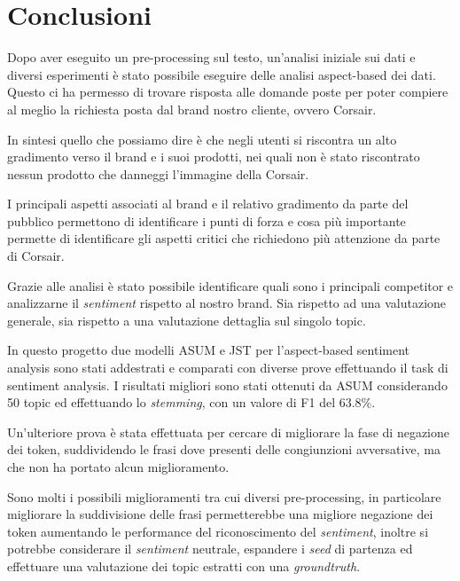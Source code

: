 \section{Conclusioni}
Dopo aver eseguito un pre-processing sul testo, un'analisi iniziale sui dati e diversi esperimenti è stato possibile eseguire delle analisi aspect-based dei dati. Questo ci ha permesso di trovare risposta alle domande poste per poter compiere al meglio la richiesta posta dal brand nostro cliente, ovvero Corsair.

In sintesi quello che possiamo dire è che negli utenti si riscontra un alto gradimento verso il brand e i suoi prodotti, nei quali non è stato riscontrato nessun prodotto che danneggi l'immagine della Corsair.

I principali aspetti associati al brand e il relativo gradimento da parte del pubblico permettono di identificare i punti di forza e cosa più importante permette di identificare gli aspetti critici che richiedono più attenzione da parte di Corsair.

Grazie alle analisi è stato possibile identificare quali sono i principali competitor e analizzarne il \textit{sentiment} rispetto al nostro brand. Sia rispetto ad una valutazione generale, sia rispetto a una valutazione dettaglia sul singolo topic.

In questo progetto due modelli ASUM e JST per l'aspect-based sentiment analysis sono stati addestrati e comparati con diverse prove effettuando il task di sentiment analysis. I risultati migliori sono stati ottenuti da ASUM considerando 50 topic ed effettuando lo \textit{stemming}, con un valore di F1 del 63.8\%.

Un'ulteriore prova è stata effettuata per cercare di migliorare la fase di negazione dei token, suddividendo le frasi dove presenti delle congiunzioni avversative, ma che non ha portato alcun miglioramento.

Sono molti i possibili miglioramenti tra cui diversi pre-processing, in particolare migliorare la suddivisione delle frasi permetterebbe una migliore negazione dei token aumentando le performance del riconoscimento del \textit{sentiment}, inoltre si potrebbe considerare il \textit{sentiment} neutrale, espandere i \textit{seed} di partenza ed effettuare una valutazione dei topic estratti con una \textit{groundtruth}.
